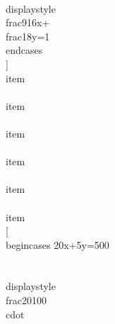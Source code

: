 		 \\displaystyle \\frac{9}{16}x+\\frac{1}{8}y=1
		\\end{cases}
	       \\]
	 \\item \\[
		\\begin{cases}
		 2x+3y=5\\\\
		 x+2y=4
		\\end{cases}
	       \\]
	 \\item \\[
		\\begin{cases}
		 5x-5y=-8\\\\
		 6x+7y=-7
		\\end{cases}
	       \\]
	 \\item \\[
		\\begin{cases}
		 10x-7y=8\\\\
		 9x-8y=5
		\\end{cases}
	       \\]
	 \\item \\[
		\\begin{cases}
		 \\displaystyle x+y=\\frac{1}{90}\\\\
		 99x+100y=1
		\\end{cases}
	       \\]
	 \\item \\[
		\\begin{cases}
		 0.04x+0.08y=28\\\\
		 0.12x+0.18y=72
		\\end{cases}
	       \\]
	 \\item \\[
		\\begin{cases}
		 20x+5y=500\\\\
		 \\displaystyle \\frac{20}{100} \\cdot
